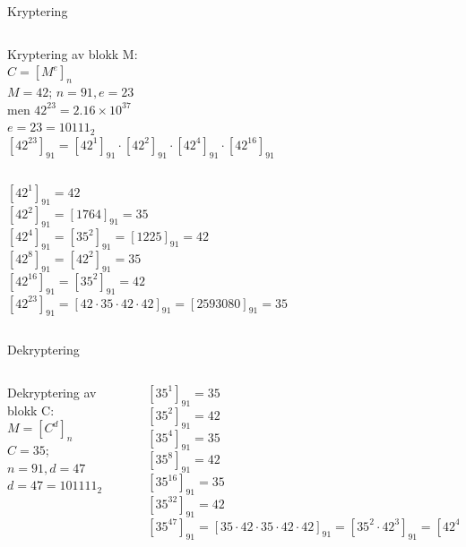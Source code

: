 \begin{frame}{Kryptering}
    \begin{column}{0.45 \textwidth}
        Kryptering av blokk M:\\
        $C=[M^{e}]_{n}$\\
        $M=42$; $n=91, e=23$\\
        men $42^{23}=2.16\times 10^{37}$\\
        \pause
        $e=23=10111_2$\\
        
        $[42^{23}]_{91}=[42^{1}]_{91}\cdot[42^{2}]_{91}\cdot[42^{4}]_{91}\cdot [42^{16}]_{91}$
        \end{column}
        \pause
        \begin{column}{0.45 \textwidth}
         $[42^1]_{91}=42$\\
         $[42^2]_{91}=[1764]_{91}=35$\\
         $[42^4]_{91}=[35^2]_{91}=[1225]_{91}=42$\\
         $[42^8]_{91}=[42^2]_{91}=35$\\
         $[42^{16}]_{91}=[35^2]_{91}=42$\\
         
         $[42^{23}]_{91}=[42\cdot 35\cdot 42\cdot 42]_{91}=[2593080]_{91}=35$
        \end{column}
\end{frame}

\begin{frame}{Dekryptering}
    \begin{columns}
        \begin{column}{0.45 \textwidth}
        Dekryptering av blokk C:\\
        $M=[C^d]_{n}$\\
        $C=35$; $n=91, d=47$\\
        $d=47=101111_2$\\
        \end{column}

        \begin{column}{0.45 \textwidth}
        $[35^1]_{91}=35$\\
        $[35^2]_{91}=42$\\
        $[35^4]_{91}=35$\\
        $[35^8]_{91}=42$\\
        $[35^{16}]_{91}=35$\\
        $[35^{32}]_{91}=42$\\
        $[35^{47}]_{91}=[35\cdot 42\cdot 35 \cdot 42 \cdot 42]_{91}=[35^2\cdot 42^3]_{91}=[42^4]_{91}=42$
        \end{column}
    \end{columns}
\end{frame}

